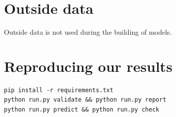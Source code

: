 \documentclass[11pt,a4paper]{article}
\begin{document}
\section*{Outside data}

Outside data is not used during the building of models.

\section*{Reproducing our results}

\begin{lstlisting}
pip install -r requirements.txt
python run.py validate && python run.py report
python run.py predict && python run.py check
\end{lstlisting}
\end{document}

